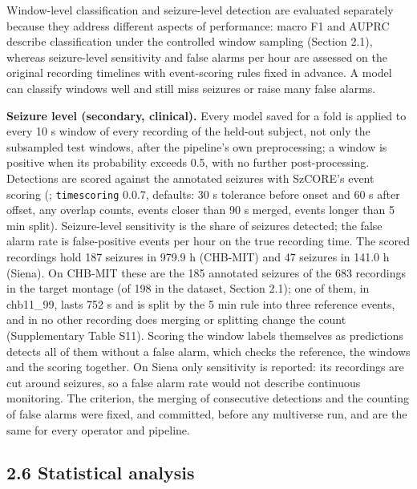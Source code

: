 \documentclass[11pt,a4paper]{article}
\begin{document}
Window-level classification and seizure-level detection are evaluated separately
because they address different aspects of performance: macro F1 and AUPRC describe
classification under the controlled window sampling (Section 2.1), whereas
seizure-level sensitivity and false alarms per hour are assessed on the original
recording timelines with event-scoring rules fixed in advance. A model can classify
windows well and still miss seizures or raise many false alarms.

\textbf{Seizure level (secondary, clinical).} Every model saved for a fold is applied to
every 10 s window of every recording of the held-out subject, not only the subsampled
test windows, after the pipeline's own preprocessing; a window is positive when its
probability exceeds 0.5, with no further post-processing. Detections are scored
against the annotated seizures with SzCORE's event scoring (\citealp{Dan_2024};
\nolinkurl{timescoring} 0.0.7, defaults: 30 s tolerance before onset and 60 s after offset, any
overlap counts, events closer than 90 s merged, events longer than 5 min split).
Seizure-level sensitivity is the share of seizures detected; the false alarm rate is
false-positive events per hour on the true recording time. The scored recordings hold
187 seizures in 979.9 h (CHB-MIT) and 47 seizures in 141.0 h (Siena). On CHB-MIT these
are the 185 annotated seizures of the 683 recordings in the target montage (of 198 in
the dataset, Section 2.1); one of them, in chb11\_99, lasts 752 s and is split by the
5 min rule into three reference events, and in no other recording does merging or
splitting change the count (Supplementary Table S11). Scoring the
window labels themselves as predictions detects all of them without a false alarm,
which checks the reference, the windows and the scoring together. On Siena only
sensitivity is reported: its recordings are cut around seizures, so a false alarm
rate would not describe continuous monitoring. The criterion, the merging of
consecutive detections and the counting of false alarms were fixed, and committed,
before any multiverse run, and are the same for every operator and
pipeline.

\subsection{2.6 Statistical analysis}\label{statistical-analysis}
\end{document}
